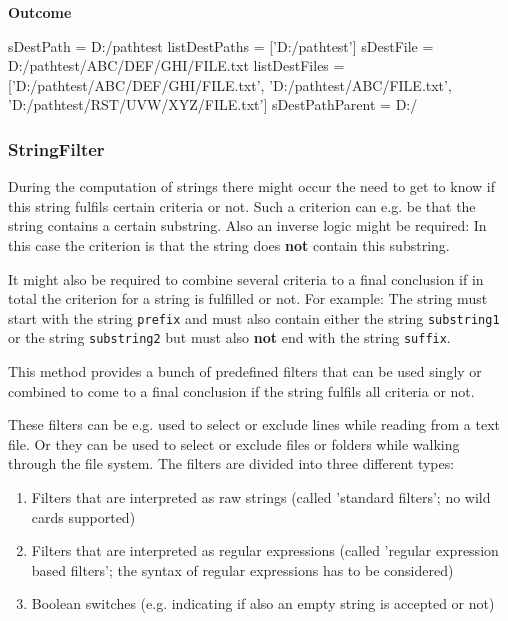 \textbf{Outcome}

\begin{pythonlog}
sDestPath       = D:/pathtest
listDestPaths   = ['D:/pathtest']
sDestFile       = D:/pathtest/ABC/DEF/GHI/FILE.txt
listDestFiles   = ['D:/pathtest/ABC/DEF/GHI/FILE.txt', 'D:/pathtest/ABC/FILE.txt', 'D:/pathtest/RST/UVW/XYZ/FILE.txt']
sDestPathParent = D:/
\end{pythonlog}

\newpage

\subsubsection{StringFilter}

During the computation of strings there might occur the need to get to know if this string fulfils certain criteria or not.
Such a criterion can e.g. be that the string contains a certain substring. Also an inverse logic might be required:
In this case the criterion is that the string does \textbf{not} contain this substring.

It might also be required to combine several criteria to a final conclusion if in total the criterion for a string is fulfilled or not.
For example: The string must start with the string \texttt{prefix} and must also contain either the string \texttt{substring1} or
the string \texttt{substring2} but must also \textbf{not} end with the string \texttt{suffix}.

This method provides a bunch of predefined filters that can be used singly or combined to come to a final conclusion if the string fulfils all criteria or not.

These filters can be e.g. used to select or exclude lines while reading from a text file. Or they can be used to select or exclude files or folders
while walking through the file system. The filters are divided into three different types:

\begin{enumerate}
   \item Filters that are interpreted as raw strings (called 'standard filters'; no wild cards supported)
   \item Filters that are interpreted as regular expressions (called 'regular expression based filters'; the syntax of regular expressions has to be considered)
   \item Boolean switches (e.g. indicating if also an empty string is accepted or not)
\end{enumerate}

